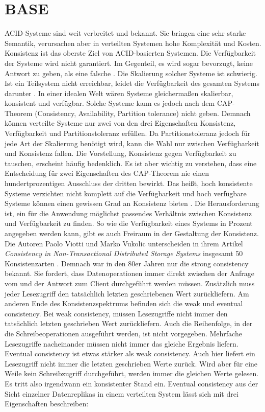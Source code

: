 \documentclass[12pt,oneside,a4paper,parskip]{scrbook}
\begin{document}
\section{BASE}
ACID-Systeme sind weit verbreitet und bekannt. Sie bringen eine sehr starke Semantik, verursachen aber in verteilten Systemen hohe Komplexität und Kosten. Konsistenz ist das oberste Ziel von ACID-basierten Systemen. Die Verfügbarkeit der Systeme wird nicht garantiert. Im Gegenteil, es wird sogar bevorzugt, keine Antwort zu geben, als eine falsche \cite{clusterBASE}. Die Skalierung solcher Systeme ist schwierig. Ist ein Teilsystem nicht erreichbar, leidet die Verfügbarkeit des gesamten Systems darunter \cite{BASE}. In einer idealen Welt wären Systeme gleichermaßen skalierbar, konsistent und verfügbar. Solche Systeme kann es jedoch nach dem CAP-Theorem (Consistency, Availability, Partition tolerance) nicht geben. Demnach können verteilte Systeme nur zwei von den drei Eigenschaften Konsistenz, Verfügbarkeit und Partitionstoleranz erfüllen. Da Partitionstoleranz jedoch für jede Art der Skalierung benötigt wird, kann die Wahl nur zwischen Verfügbarkeit und Konsistenz fallen. Die Vorstellung, Konsistenz gegen Verfügbarkeit zu tauschen, erscheint häufig bedenklich. Es ist aber wichtig zu verstehen, dass eine Entscheidung für zwei Eigenschaften des CAP-Theorem nie einen hundertprozentigen Ausschluss der dritten bewirkt.
Das heißt, hoch konsistente Systeme verzichten nicht komplett auf die Verfügbarkeit und hoch verfügbare Systeme können einen gewissen Grad an Konsistenz bieten \cite{cap}. Die Herausforderung ist, ein für die Anwendung möglichst passendes Verhältnis zwischen Konsistenz und Verfügbarkeit zu finden. So wie die Verfügbarkeit eines Systems in Prozent angegeben werden kann, gibt es auch Freiraum in der Gestaltung der Konsistenz. Die Autoren Paolo Viotti und Marko Vukolic unterscheiden in ihrem Artikel \textit{Consistency in Non-Transactional Distributed Storage Systems} insgesamt 50 Konsistenzarten \cite{consistency}. Demnach war in den 80er Jahren nur die strong consistency bekannt. Sie fordert, dass Datenoperationen immer direkt zwischen der Anfrage vom und der Antwort zum Client durchgeführt werden müssen. Zusätzlich muss jeder Lesezugriff den tatsächlich letzten geschriebenen Wert zurückliefern. Am anderen Ende des Konsistenzspektrums befinden sich die weak und eventual consistency. Bei weak consistency, müssen Lesezugriffe nicht immer den tatsächlich letzten geschrieben Wert zurückliefern. Auch die Reihenfolge, in der die Schreibeoperationen ausgeführt werden, ist nicht vorgegeben. Mehrfache Lesezugriffe nacheinander müssen nicht immer das gleiche Ergebnis liefern. Eventual consistency ist etwas stärker als weak consistency. Auch hier liefert ein Lesezugriff nicht immer die letzten geschrieben Werte zurück. Wird aber für eine Weile kein Schreibzugriff durchgeführt, werden immer die gleichen Werte gelesen. Es tritt also irgendwann ein konsistenter Stand ein. Eventual consistency aus der Sicht einzelner Datenreplikas in einem verteilten System lässt sich mit drei Eigenschaften beschreiben:
\end{document}
